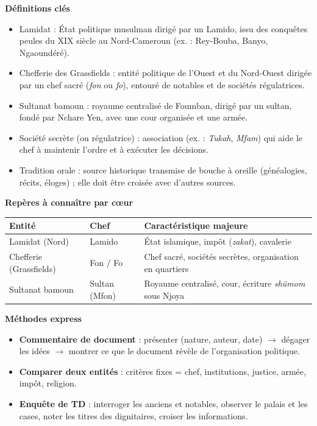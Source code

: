\documentclass[11pt]{article}
\newcommand{\cle}[1]{{\popxbold\color{popdark}#1}}
\begin{document}
\begin{bilan}
\textbf{Définitions clés}
\begin{itemize}
  \item \cle{Lamidat} : État politique musulman dirigé par un \cle{Lamido}, issu des conquêtes peules du XIX siècle au Nord-Cameroun (ex. : Rey-Bouba, Banyo, Ngaoundéré).
  \item \cle{Chefferie des Grassfields} : entité politique de l'Ouest et du Nord-Ouest dirigée par un chef sacré (\emph{fon} ou \emph{fo}), entouré de notables et de sociétés régulatrices.
  \item \cle{Sultanat bamoun} : royaume centralisé de Foumban, dirigé par un sultan, fondé par Nchare Yen, avec une cour organisée et une armée.
  \item \cle{Société secrète (ou régulatrice)} : association (ex. : \emph{Tukah}, \emph{Mfam}) qui aide le chef à maintenir l'ordre et à exécuter les décisions.
  \item \cle{Tradition orale} : source historique transmise de bouche à oreille (généalogies, récits, éloges) ; elle doit être croisée avec d'autres sources.
\end{itemize}

\textbf{Repères à connaître par cœur}
\begin{center}
\begin{tabularx}{\linewidth}{|l|X|X|}\hline
\rowcolor{popblueL} \textbf{Entité} & \textbf{Chef} & \textbf{Caractéristique majeure} \\ \hline
Lamidat (Nord) & Lamido & État islamique, impôt (\emph{zakat}), cavalerie \\ \hline
Chefferie (Grassfields) & Fon / Fo & Chef sacré, sociétés secrètes, organisation en quartiers \\ \hline
Sultanat bamoun & Sultan (Mfon) & Royaume centralisé, cour, écriture \emph{shümom} sous Njoya \\ \hline
\end{tabularx}
\end{center}

\textbf{Méthodes express}
\begin{itemize}
  \item \textbf{Commentaire de document} : présenter (nature, auteur, date) $\rightarrow$ dégager les idées $\rightarrow$ montrer ce que le document révèle de l'organisation politique.
  \item \textbf{Comparer deux entités} : critères fixes = chef, institutions, justice, armée, impôt, religion.
  \item \textbf{Enquête de TD} : interroger les anciens et notables, observer le palais et les cases, noter les titres des dignitaires, croiser les informations.
\end{itemize}
\end{bilan}
\end{document}
